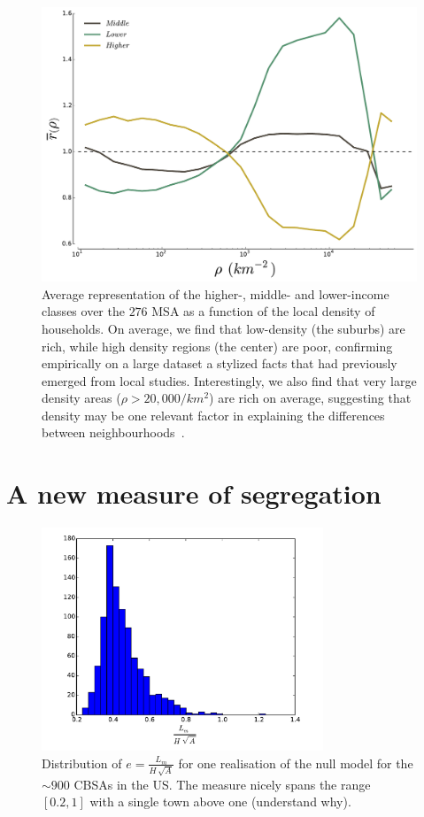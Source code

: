 \begin{figure}
    \centering
    \includegraphics[width=\textwidth]{gfx/chapter-segregation/figure4.pdf}
    \caption{Average representation of the higher-, middle- and
      lower-income classes over the $276$ MSA as a function of the
      local density of households. On average, we find that low-density (the
  suburbs) are rich, while high density regions (the center) are poor,
  confirming empirically on a large dataset a stylized facts that had previously
  emerged from local studies. Interestingly, we also
  find that  very large density areas ($\rho>20,000/km^2$) are rich on average,
  suggesting that density may be one relevant factor in explaining the
  differences between neighbourhoods~\cite{Jacobs:1961}.
  \label{fig:high_low_densities}} 
  \end{figure}

\section{A new measure of segregation}
\label{sec:a_new_measure_of_segregation}


\begin{figure}
    \centering
    \includegraphics[width=0.75\textwidth]{gfx/chapter-segregation/index_distribution.pdf}
    \caption{Distribution of $e = \frac{L_m}{H\,\sqrt{A}}$ for one realisation
    of the null model for the $\sim 900$ CBSAs in the US. The measure nicely
spans the range $\left[ 0.2, 1 \right]$ with a single town above one (understand
why). \label{fig:label_fig}}
\end{figure}


